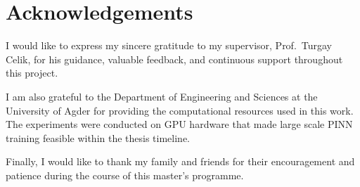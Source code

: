\chapter*{Acknowledgements}

I would like to express my sincere gratitude to my supervisor,
Prof.\ Turgay Celik, for his guidance, valuable feedback, and continuous
support throughout this project.

I am also grateful to the Department of Engineering and Sciences at the
University of Agder for providing the computational resources used in this
work.  The experiments were conducted on GPU hardware that made large scale
PINN training feasible within the thesis timeline.

Finally, I would like to thank my family and friends for their encouragement
and patience during the course of this master's programme.
